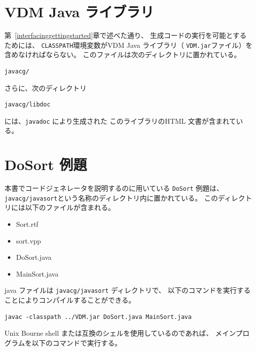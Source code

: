 \documentclass[\pformat,11pt]{jarticle}
\newcommand{\JL}{VDM Java ライブラリ}
\begin{document}
\newpage
\section{VDM Java ライブラリ}\label{VDMJavalib}

第~\ref{interfacinggettingstarted}章で述べた通り、
生成コードの実行を可能とするためには、 {\tt CLASSPATH}環境変数が\JL{}（ {\tt VDM.jar}ファイル）を含めなければならない。  
このファイルは次のディレクトリに置かれている。

\begin{screen}
\begin{verbatim}
javacg/
\end{verbatim}
\end{screen}

さらに、次のディレクトリ

\begin{screen}
\begin{verbatim}
javacg/libdoc
\end{verbatim}
\end{screen}

には、{\tt javadoc} により生成された このライブラリのHTML 文書が含まれている。

\newpage
\section{DoSort 例題}\label{dosortexample}
本書でコードジェネレータを説明するのに用いている \texttt{DoSort} 例題は、
{\tt javacg/javasort}という名称のディレクトリ内に置かれている。
このディレクトリには以下のファイルが含まれる。

\begin{itemize}
\item Sort.rtf
\item sort.vpp
\item DoSort.java
\item MainSort.java
\end{itemize}

java ファイルは {\tt javacg/javasort} ディレクトリで、
以下のコマンドを実行することによりコンパイルすることができる。

\begin{screen}
\begin{verbatim}
javac -classpath ../VDM.jar DoSort.java MainSort.java
\end{verbatim}
\end{screen}

Unix Bourne shell または互換のシェルを使用しているのであれば、
メインプログラムを以下のコマンドで実行する。
\end{document}
